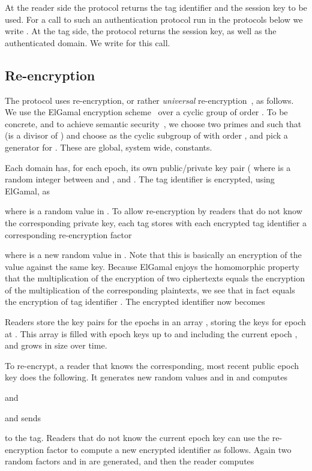 At the reader side the protocol returns the tag identifier and the
session key to be used.
For a call to such an
authentication protocol run in the protocols below
we write
.
At the tag side, the protocol returns the session key, as well as 
the authenticated domain.
We write  for this call.

\subsection{Re-encryption}
\label{ssec-reencrypt}

The protocol uses re-encryption, or rather \emph{universal}
re-encryption~\cite{golle2004reencryption}, as follows. 
We use the ElGamal encryption scheme~\cite{DBLP:journals/tit/Elgamal85}
over a cyclic group  of order .
To be
concrete, and to achieve semantic security~\cite{DBLP:conf/pkc/TsiounisY98}, we
choose two primes  and  such that  (\ie  is a divisor of
) and choose as  the cyclic subgroup of  with order , and 
pick a generator  for . These are global, system wide, constants.



Each domain has, for each epoch, its own public/pri\-vate key pair (
where  is a random integer between  and , and .
The tag identifier  is encrypted, using ElGamal, as

where  is a random value in . 
To allow re-encryption by readers that do not know the corresponding private
key, each tag stores with each encrypted tag identifier a corresponding
re-encryption factor

where  is a new random value in . 
Note that this is basically an encryption of
the value  against the same key. Because ElGamal enjoys the homomorphic
property that the multiplication of the encryption of two ciphertexts equals
the encryption of the multiplication of the corresponding plaintexts, we see
that  in fact equals the encryption of tag identifier .
The encrypted identifier now becomes


Readers store the key pairs for the epochs in an array , storing
the keys for epoch  at . This array is filled with epoch
keys up to and including the current epoch , and grows in size over
time. 

To re-encrypt, a reader that knows the corresponding, most recent public epoch
key  does the following. It generates new random
values  and  in  and computes

and

and sends

to the tag.
Readers that do not know the current epoch key can use the re-encryption 
factor to compute a new encrypted identifier as follows. Again two random
factors  and  in  are generated, and then the reader computes

